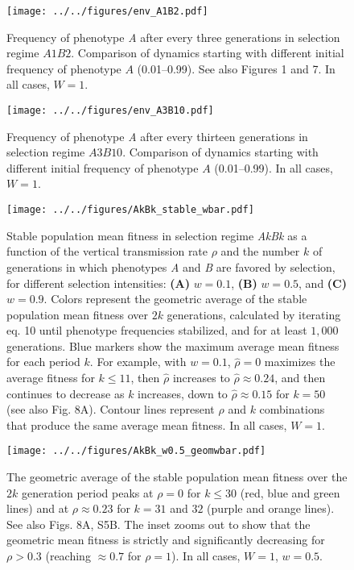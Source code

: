 \documentclass[]{article}
\begin{document}
\begin{figure}
\centering
\texttt{[image: ../../figures/env\_A1B2.pdf]}
\caption{Frequency of phenotype \emph{A} after every three generations in
selection regime $A1B2$. Comparison of dynamics starting with
different initial frequency of phenotype \(A\) (0.01--0.99).
See also Figures 1 and  7. In all cases, $W=1$.}\label{fig:env_A1B2}
\end{figure}

\begin{figure}
\centering
\texttt{[image: ../../figures/env\_A3B10.pdf]}
\caption{Frequency of phenotype \emph{A} after every thirteen generations in
selection regime $A3B10$. Comparison of dynamics starting with
different initial frequency of phenotype \(A\) (0.01--0.99).
In all cases, $W=1$.}\label{fig:env_A3B10}
\end{figure}

\begin{figure}
\centering
\texttt{[image: ../../figures/AkBk\_stable\_wbar.pdf]}
\caption{Stable population mean fitness in selection regime \emph{AkBk} as a function of the vertical transmission rate \(\rho\) and the number \(k\) of generations in which phenotypes \emph{A} and \emph{B} are favored by selection, for different selection intensities: \textbf{(A)} \(w=0.1\), \textbf{(B)} \(w=0.5\), and \textbf{(C)} \(w=0.9\).
Colors represent the geometric average of the stable population mean fitness over \(2k\) generations, calculated by iterating eq. 10 until phenotype frequencies stabilized, and for at least \(1,000 \) generations.
Blue markers show the maximum average mean fitness for each period \(k\).
For example, with \(w=0.1\), \(\hat{\rho}=0\) maximizes the average fitness for \(k \le 11\), then \(\hat{\rho}\) increases to \(\hat{\rho} \approx 0.24\), and then continues to decrease as \(k\) increases, down to \(\hat{\rho} \approx 0.15\) for \(k=50\) (see also Fig. 8A).
Contour lines represent \(\rho\) and \(k\) combinations that produce the same average mean fitness. 
In all cases, $W=1$.}\label{fig:AkBk_stable_wbar}
\end{figure}

\begin{figure}
\centering
\texttt{[image: ../../figures/AkBk\_w0.5\_geomwbar.pdf]}
\caption{The geometric average of the stable population mean fitness over the $2k$ generation period peaks at $\rho=0$ for $k \le 30$ (red, blue and green lines) and at $\rho \approx 0.23$ for $k=31$ and $32$ (purple and orange lines). 
See also Figs. 8A, S5B. The inset zooms out to show that the geometric mean fitness is strictly and significantly decreasing for $\rho>0.3$ (reaching $\approx 0.7$ for $\rho=1$).
In all cases, $W=1$, $w=0.5$.}\label{fig:AkBk_w0.5_geomwbar}
\end{figure}
\end{document}
